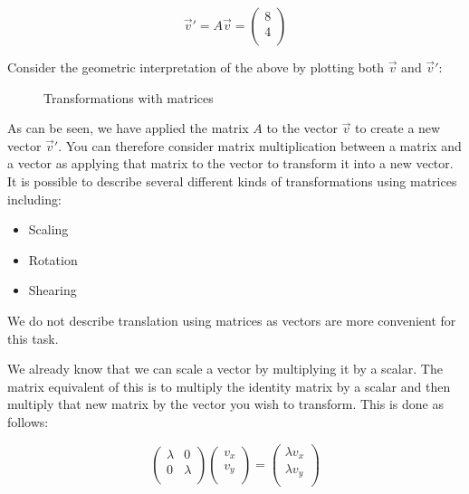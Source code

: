 \documentclass[a4paper,oneside]{report}
\begin{document}
\[ \overrightarrow{v}' = A\overrightarrow{v} = \begin{pmatrix}
	8 \\
	4 \\
\end{pmatrix} \]

Consider the geometric interpretation of the above by plotting both
\( \overrightarrow{v} \) and \( \overrightarrow{v}' \):

\begin{figure}[h]
	\centering

	Transformations with matrices
\end{figure}

As can be seen, we have applied the matrix \( A \) to the vector
\( \overrightarrow{v} \) to create a new vector \( \overrightarrow{v}' \). You
can therefore consider matrix multiplication between a matrix and a vector as
applying that matrix to the vector to transform it into a new vector. It is
possible to describe several different kinds of transformations using matrices
including:

\begin{itemize}
	\item{Scaling}
	\item{Rotation}
	\item{Shearing}
\end{itemize}

We do not describe translation using matrices as vectors are more convenient
for this task.

We already know that we can scale a vector by multiplying it by a scalar. The
matrix equivalent of this is to multiply the identity matrix by a scalar and
then multiply that new matrix by the vector you wish to transform. This is
done as follows:

\[ \begin{pmatrix}
	\lambda & 0 \\
	0 & \lambda \\
\end{pmatrix} \begin{pmatrix}
	v_x \\
	v_y \\
\end{pmatrix} = \begin{pmatrix}
	\lambda v_x \\
	\lambda v_y \\
\end{pmatrix} \]
\end{document}
